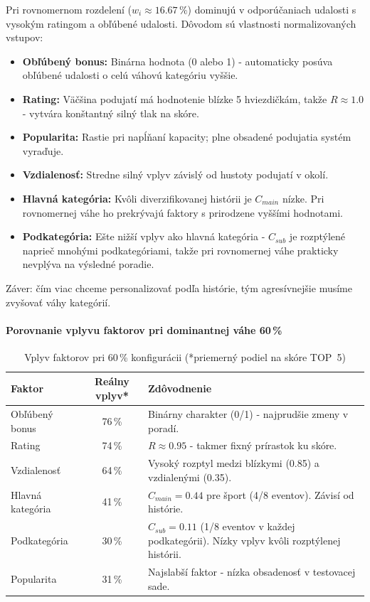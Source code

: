 Pri rovnomernom rozdelení ($w_i \approx 16.67\,\%$) dominujú v odporúčaniach
udalosti s vysokým ratingom a obľúbené udalosti. Dôvodom sú vlastnosti
normalizovaných vstupov:

\begin{itemize}[noitemsep, nolistsep]
    \item \textbf{Obľúbený bonus:} Binárna hodnota (0 alebo 1) - automaticky
    posúva obľúbené udalosti o celú váhovú kategóriu vyššie.
    \item \textbf{Rating:} Väčšina podujatí má hodnotenie blízke 5 hviezdičkám,
    takže $R \approx 1.0$ - vytvára konštantný silný tlak na skóre.
    \item \textbf{Popularita:} Rastie pri napĺňaní kapacity; plne obsadené
    podujatia systém vyraďuje.
    \item \textbf{Vzdialenosť:} Stredne silný vplyv závislý od hustoty podujatí
    v okolí.
    \item \textbf{Hlavná kategória:} Kvôli diverzifikovanej histórii je $C_{main}$
    nízke. Pri rovnomernej váhe ho prekrývajú faktory s prirodzene vyššími hodnotami.
    \item \textbf{Podkategória:} Ešte nižší vplyv ako hlavná kategória -
    $C_{sub}$ je rozptýlené naprieč mnohými podkategóriami, takže pri rovnomernej
    váhe prakticky nevplýva na výsledné poradie.
\end{itemize}

Záver: čím viac chceme personalizovať podľa histórie, tým agresívnejšie musíme
zvyšovať váhy kategórií.

\paragraph{Porovnanie vplyvu faktorov pri dominantnej váhe 60\,\%}

\begin{table}[H]
\centering
\small
\begin{tabular}{|l|c|p{8cm}|}
\hline
\textbf{Faktor} & \textbf{Reálny vplyv*} & \textbf{Zdôvodnenie} \\
\hline
Obľúbený bonus   & 76\,\% & Binárny charakter (0/1) - najprudšie zmeny v poradí. \\
\hline
Rating           & 74\,\% & $R \approx 0.95$ - takmer fixný prírastok ku skóre. \\
\hline
Vzdialenosť      & 64\,\% & Vysoký rozptyl medzi blízkymi (0.85) a vzdialenými (0.35). \\
\hline
Hlavná kategória & 41\,\% & $C_{main} = 0.44$ pre šport (4/8 eventov). Závisí od histórie. \\
\hline
Podkategória     & 30\,\% & $C_{sub} = 0.11$ (1/8 eventov v každej podkategórii). Nízky
vplyv kvôli rozptýlenej histórii. \\
\hline
Popularita       & 31\,\% & Najslabší faktor - nízka obsadenosť v testovacej sade. \\
\hline
\end{tabular}
\caption{Vplyv faktorov pri 60\,\% konfigurácii (*priemerný podiel na skóre TOP~5)}
\label{tab:vplyv_faktorov}
\end{table}

